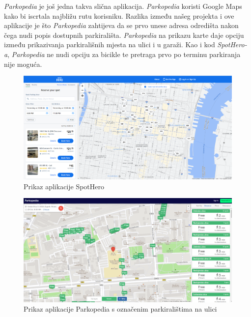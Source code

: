 		 \textit {Parkopedia} je još jedna takva slična aplikacija. \textit {Parkopedia} koristi Google Maps kako bi iscrtala najbližu rutu korisniku. Razlika između našeg projekta i ove aplikacije je što \textit {Parkopedia} zahtijeva da se prvo unese adresa odredišta nakon čega nudi popis dostupnih parkirališta. \textit {Parkopedia} na prikazu karte daje opciju između prikazivanja parkirališnih mjesta na ulici i u garaži. Kao i kod \textit {SpotHero-a}, \textit {Parkopedia} ne nudi opciju za bicikle te pretraga prvo po terminu parkiranja nije moguća.
		
		\begin{figure}[H]
			\includegraphics[width=\textwidth]{slike/spothero.PNG} %
			\caption{Prikaz aplikacije SpotHero}
			\label{fig:promjene3} %
		\end{figure}
		
		\begin{figure}[H]
			\includegraphics[width=\textwidth]{slike/parkopedia_street.PNG} %
			\caption{Prikaz aplikacije Parkopedia s označenim parkiralištima na ulici}
			\label{fig:promjene4} %
		\end{figure}
		
